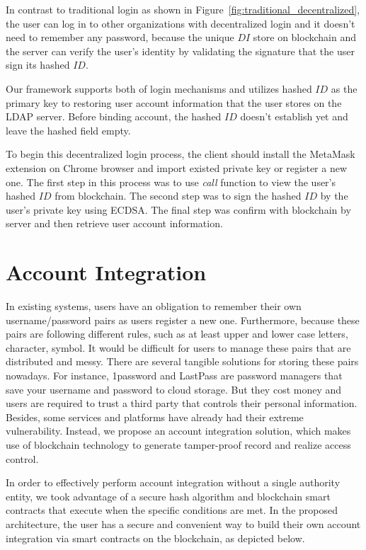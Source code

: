 In contrast to traditional login as shown in Figure~\ref{fig:traditional_decentralized}, the user can log in to other organizations with decentralized login and it doesn't need to remember any password, because the unique \(DI\) store on blockchain and the server can verify the user's identity by validating the signature that the user sign its hashed \(ID\).\par
Our framework supports both of login mechanisms and utilizes hashed \(ID\) as the primary key to restoring user account information that the user stores on the LDAP server. Before binding account, the hashed \(ID\) doesn't establish yet and leave the hashed field empty.\par 
To begin this decentralized login process, the client should install the MetaMask extension on Chrome browser and import existed private key or register a new one. The first step in this process was to use \textit{call} function to view the user's hashed \(ID\) from blockchain. The second step was to sign the hashed \(ID\) by the user's private key using ECDSA. The final step was confirm with blockchain by server and then retrieve user account information.

\section{Account Integration}
In existing systems, users have an obligation to remember their own username/password pairs as users register a new one. Furthermore, because these pairs are following different rules, such as at least upper and lower case letters, character, symbol. It would be difficult for users to manage these pairs that are distributed and messy. There are several tangible solutions for storing these pairs nowadays. For instance, 1password and LastPass are password managers that save your username and password to cloud storage. But they cost money and users are required to trust a third party that controls their personal information. Besides, some services and platforms have already had their extreme vulnerability. Instead, we propose an account integration solution, which makes use of blockchain technology to generate tamper-proof record and realize access control.\par 
In order to effectively perform account integration without a single authority entity, we took advantage of a secure hash algorithm and blockchain smart contracts that execute when the specific conditions are met. In the proposed architecture, the user has a secure and convenient way to build their own account integration via smart contracts on the blockchain, as depicted below.

